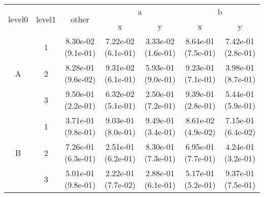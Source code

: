 \begin{tabular}{ccccccc}
\toprule
\multirow{2}{*}{level0} & \multirow{2}{*}{level1}& \multirow{2}{*}{other}&\multicolumn{2}{c}{a}&\multicolumn{2}{c}{b}\tabularnewline
\cmidrule(lr){4-5}
\cmidrule(lr){6-7}
&&&x&y&x&y\tabularnewline
\midrule
\multirow{3}{*}{A}&1& 8.30e-02 (9.1e-01)& 7.22e-02 (6.1e-01)& 3.33e-02 (1.6e-01)& 8.64e-01 (7.5e-01)& 7.42e-01 (2.8e-01)\tabularnewline
&2& 8.28e-01 (9.6e-02)& 9.31e-02 (6.1e-01)& 5.93e-01 (9.0e-01)& 9.23e-01 (7.1e-01)& 3.98e-01 (8.7e-01)\tabularnewline
&3& 9.50e-01 (2.2e-01)& 6.32e-02 (5.1e-01)& 2.50e-01 (7.2e-01)& 9.39e-01 (2.8e-01)& 5.44e-01 (5.9e-01)\tabularnewline
\midrule
\multirow{3}{*}{B}&1& 3.71e-01 (9.8e-01)& 9.03e-01 (8.0e-01)& 9.49e-01 (3.4e-01)& 8.61e-02 (4.9e-02)& 7.15e-01 (6.4e-02)\tabularnewline
&2& 7.26e-01 (6.3e-01)& 2.51e-01 (6.2e-01)& 8.30e-01 (7.3e-01)& 6.95e-01 (7.7e-01)& 4.24e-01 (3.2e-01)\tabularnewline
&3& 5.01e-01 (9.8e-01)& 2.22e-01 (7.7e-02)& 2.88e-01 (6.1e-01)& 5.17e-01 (5.2e-01)& 9.37e-01 (7.5e-01)\tabularnewline
\bottomrule
\end{tabular}
